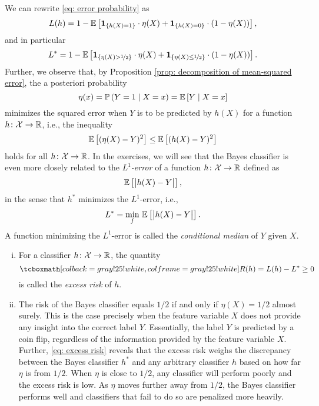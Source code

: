 \begin{remark}
We can rewrite \eqref{eq: error probability} as
\[
    L(h) = 1 - \mathbb{E}\left[\mathbf{1}_{\left\{h(X) = 1\right\}} \cdot \eta(X) + \mathbf{1}_{\left\{h(X) = 0\right\}} \cdot (1 - \eta(X))\right],
\]
and in particular
\[
    L^* = 1 - \mathbb{E}\left[\mathbf{1}_{\left\{\eta(X) > \nicefrac{1}{2}\right\}} \cdot \eta(X) + \mathbf{1}_{\left\{\eta(X) \leq \nicefrac{1}{2}\right\}} \cdot (1 - \eta(X))\right].
\]
Further, we observe that, by Proposition \ref{prop: decomposition of mean-squared error}, the a posteriori probability
\[
    \eta(x) = \mathbb{P}\left(Y=1 \mathrel{|} X=x\right) = \mathbb{E}\left[Y \mathrel{|} X=x\right]
\]
minimizes the squared error when $Y$ is to be predicted by $h(X)$ for a function $h \colon \mathcal{X} \to \mathbb{R}$, i.e., the inequality
\[
    \mathbb{E}\left[(\eta(X) - Y)^2\right] \leq \mathbb{E}\left[(h(X) - Y)^2\right]
\]
holds for all $h \colon \mathcal{X} \to \mathbb{R}$. In the exercises, we will see that the Bayes classifier is even more closely related to the \emph{$L^1$-error} of a function $h \colon \mathcal{X} \to \mathbb{R}$ defined as
\[
    \mathbb{E}\left[\big\lvert h(X) - Y \big\rvert\right],
\]
in the sense that $h^*$ minimizes the $L^1$-error, i.e.,
\[
    L^* = \min_f \, \mathbb{E}\left[\big\lvert h(X) - Y \big\rvert\right].
\]
A function minimizing the $L^1$-error is called the \emph{conditional median} of $Y$ given $X$.
\end{remark}

\begin{remark}
    \begin{enumerate}[(i)]
        \item For a classifier $h \colon \mathcal{X} \to \mathbb{R}$, the quantity
        \[
            \highlightMath{
                R(h) = L(h) - L^* \geq 0
            }
        \]
        is called the \emph{excess risk} of $h$.
        
        \item The risk of the Bayes classifier equals $1/2$ if and only if $\eta(X) = 1/2$ almost surely. This is the case precisely when the feature variable $X$ does not provide any insight into the correct label $Y$. Essentially, the label $Y$ is predicted by a coin flip, regardless of the information provided by the feature variable $X$. Further, \eqref{eq: excess risk} reveals that the excess risk weighs the discrepancy between the Bayes classifier $h^*$ and any arbitrary classifier $h$ based on how far $\eta$ is from $1/2$. When $\eta$ is close to $1/2$, any classifier will perform poorly and the excess risk is low. As $\eta$ moves further away from $1/2$, the Bayes classifier performs well and classifiers that fail to do so are penalized more heavily.
    \end{enumerate}
\end{remark}

